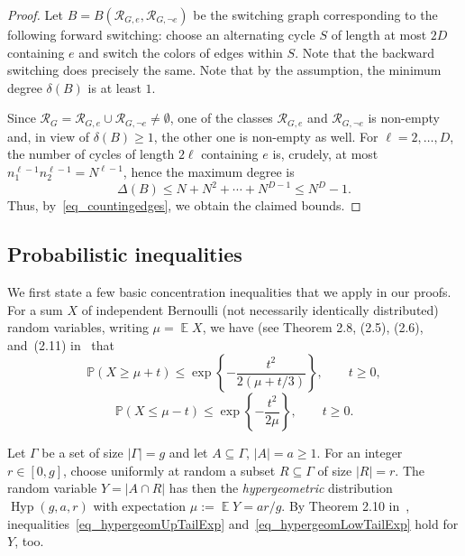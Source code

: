 \documentclass[12pt,reqno]{amsart}
\newcommand{\E}{\operatorname{\mathbb{E}}}
\newcommand{\rc}{{\mathcal{R}}}
\newcommand{\Prob} {\mathbb {P}}
\newcommand{\prob}[1]{\Prob\left(#1\right)}
\newcommand{\Hyp}{\operatorname{Hyp}}
\theoremstyle{definition}
\begin{document}
\begin{proof}
  Let $B = B(\rc_{G,e}, \rc_{G,\neg e})$ be the switching graph corresponding to the following forward switching: choose an alternating cycle $S$ of length at most $2D$ containing $e$ and switch the colors of edges within $S$. Note that the backward switching does precisely the same.
Note that by  the assumption, the minimum degree $\delta(B)$ is at least $1$.

Since  $\rc_G=\rc_{G, e}\cup\rc_{G, \neg e} \neq \emptyset$, one of the classes $\rc_{G, e}$ and $\rc_{G, \neg e}$ is non-empty and, in view of $\delta(B) \ge 1$, the other one is non-empty as well. For $\ell = 2, \dots, D$, the number of cycles of length $2\ell$ containing $e$ is, crudely, at most $n_1^{\ell - 1} n_2^{\ell - 1} = N^{\ell - 1}$, hence the maximum degree is
	\[
		\Delta(B)\le N + N^2 + \cdots + N^{D - 1} \le N^D - 1.
	\]
Thus, by~\eqref{eq_countingedges}, we obtain
 the claimed bounds. \end{proof}



\subsection{Probabilistic inequalities}
\label{ss_probineq}

We first state a few basic concentration inequalities that we  apply in our proofs.
For a sum $X $ of independent Bernoulli (not necessarily identically distributed) random variables, writing $\mu = \E X$, we have (see Theorem 2.8, (2.5), (2.6), and~(2.11) in~\cite{JLR} that
	\begin{equation}
		\label{eq_hypergeomUpTailExp}
		\prob{X \ge \mu + t} \le \exp \left\{ - \frac{t^2}{2\left( \mu + t/3 \right)} \right\}, \qquad t \ge 0,
	\end{equation}
\begin{equation}
		\label{eq_hypergeomLowTailExp}
		\prob{X \le \mu - t} \le \exp \left\{ - \frac{t^2}{2\mu} \right\}, \qquad t \ge 0.
	\end{equation}
	

	Let $\Gamma$ be a set of size $|\Gamma|=g$ and let  $A \subseteq \Gamma$,  $|A|=a \ge1$. For an integer $r \in [0,g]$, choose uniformly at random a subset $R \subseteq \Gamma$ of size $|R|=r$. The random variable $Y = |A \cap R|$ has then the \emph{hypergeometric} distribution $\Hyp(g, a, r)$ with expectation $\mu := \E Y = ar/g$.
By Theorem 2.10 in~\cite{JLR}, inequalities~\eqref{eq_hypergeomUpTailExp} and~\eqref{eq_hypergeomLowTailExp} hold for $Y$, too.
\end{document}
